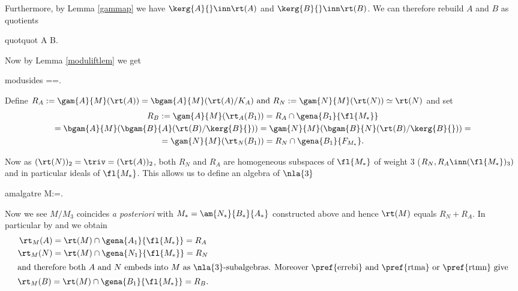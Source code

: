 Furthermore, by Lemma \ref{gammap} we have $\kerg{A}{}\inn\rt(A)$ and $\kerg{B}{}\inn\rt(B)$. We can therefore rebuild $A$ and $B$ as quotients
\begin{labeq}{quotquot}
A\simeq{}\simeq{}
B\simeq{}.
\end{labeq}
Now by Lemma \ref{moduliftlem} we get
\begin{labeq}{modusides}
\cap{}==.
\end{labeq}
Define $R_{A}:=\gam{A}{M}(\rt(A))=\bgam{A}{M}(\rt(A)/K_{A})\text{ and }%
R_{N}:=\gam{N}{M}(\rt(N))\simeq\rt(N)$ and set
\begin{multline}\label{errebi}
R_{B}:=\gam{A}{M}(\rt_{A}(B_{1}))=R_{A}\cap\gena{B_{1}}{\fl{M_{*}}}\\
=\bgam{A}{M}(\bgam{B}{A} (\rt(B)/\kerg{B}{}) )
=\gam{N}{M}(\bgam{B}{N} (\rt(B)/\kerg{B}{}) )=\\
=\gam{N}{M}(\rt_{N}(B_{1}))=R_{N}\cap\gena{B_{1}}{F_{M_{*}}}.
\end{multline}

\medskip
Now as $(\rt(N))_{2}=\triv=(\rt(A))_{2}$, both $R_{N}$ and $R_{A}$ are homogeneous subspaces of $\fl{M_{*}}$ of
weight $3$ ($R_{N},R_{A}\inn(\fl{M_{*}})_{3})$ and in particular ideals of $\fl{M_{*}}$. This allows us to define
an algebra of $\nla{3}$
\begin{labeq}{amalgatre}
M:=.
\end{labeq}

Now we see $M/M_{3}$ coincides {\em a posteriori} with $M_{*}=\am{N_{*}}{B_{*}}{A_{*}}$ constructed above and hence
$\rt(M)$ equals $R_{N}+R_{A}$.
In particular by  and  we obtain
\begin{gather}
\rt_{M}(A)=\rt(M)\cap\gena{A_{1}}{\fl{M_{*}}}=R_{A}\label{rtma}\\
\rt_{M}(N)=\rt(M)\cap\gena{N_{1}}{\fl{M_{*}}}=R_{N}\label{rtmn}\\
\intertext{and therefore both $A$ and $N$ embeds into $M$ as $\nla{3}$-subalgebras. Moreover \pref{errebi} and
\pref{rtma} or \pref{rtmn} give} 
\rt_{M}(B)=\rt(M)\cap\gena{B_{1}}{\fl{M_{*}}}=R_{B}\label{rtmb}.
\end{gather}

